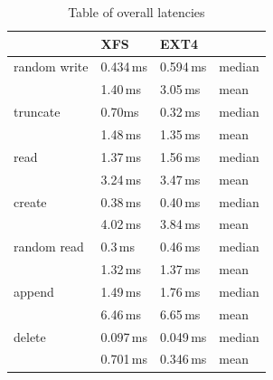 \documentclass[
  color, %
  table, %
  lof,   %
  lot,   %
]{fithesis3}
\begin{document}
\begin{table}[htb]
\centering
\caption{Table of overall latencies}
\begin{tabular}{|l|l|l|l|}
\hline
 &XFS & EXT4 &  \\
\hline
    random write & 0.434\,ms & 0.594\,ms & median \\
 \hline
                 & 1.40\,ms & 3.05\,ms & mean\\
    \hline
        truncate & 0.70ms & 0.32\,ms & median\\
    \hline
                 & 1.48\,ms & 1.35\,ms& mean \\
    \hline
            read & 1.37\,ms & 1.56\,ms & median\\
    \hline
                 & 3.24\,ms & 3.47\,ms & mean \\
    \hline
          create & 0.38\,ms & 0.40\,ms & median\\
    \hline
                 & 4.02\,ms & 3.84\,ms & mean \\
    \hline
     random read & 0.3\,ms & 0.46\,ms & median\\
    \hline
                 & 1.32\,ms & 1.37\,ms & mean \\
    \hline
          append & 1.49\,ms & 1.76\,ms & median\\
    \hline
                 & 6.46\,ms & 6.65\,ms & mean \\
    \hline
          delete & 0.097\,ms & 0.049\,ms & median\\
    \hline
                & 0.701\,ms & 0.346\,ms & mean \\
    \hline
\end{tabular}
\label{tab:ssd_xfs_ext4}
\end{table}



\end{document}
